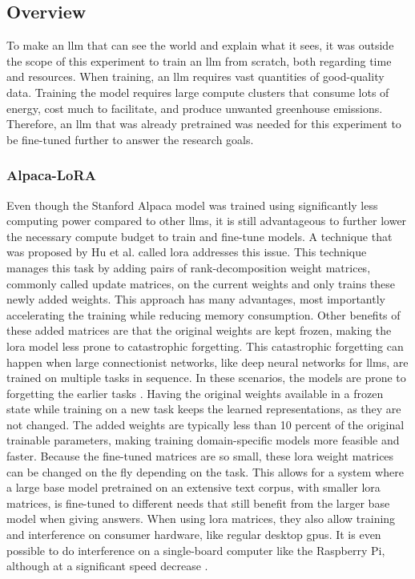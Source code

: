         \subsection{Overview}
        To make an \gls{llm} that can see the world and explain what it sees, it was outside the scope of this experiment to train an \gls{llm} from scratch, both regarding time and resources. When training, an \gls{llm} requires vast quantities of good-quality data. Training the model requires large compute clusters that consume lots of energy, cost much to facilitate, and produce unwanted greenhouse emissions. Therefore, an \gls{llm} that was already pretrained was needed for this experiment to be fine-tuned further to answer the research goals. 
        


        \subsubsection{Alpaca-LoRA}
        Even though the Stanford Alpaca model was trained using significantly less computing power compared to other \glspl{llm}, it is still advantageous to further lower the necessary compute budget to train and fine-tune models. A technique that was proposed by Hu et al. called \gls{lora} \cite{huLoRALowRankAdaptation2021} addresses this issue. This technique manages this task by adding pairs of rank-decomposition weight matrices, commonly called update matrices, on the current weights and only trains these newly added weights. This approach has many advantages, most importantly accelerating the training while reducing memory consumption. Other benefits of these added matrices are that the original weights are kept frozen, making the \gls{lora} model less prone to catastrophic forgetting. This catastrophic forgetting can happen when large connectionist networks, like deep neural networks for \glspl{llm}, are trained on multiple tasks in sequence. In these scenarios, the models are prone to forgetting the earlier tasks \cite{mccloskeyCatastrophicInterferenceConnectionist1989}. Having the original weights available in a frozen state while training on a new task keeps the learned representations, as they are not changed. The added weights are typically less than 10 percent of the original trainable parameters, making training domain-specific models more feasible and faster. 
        Because the fine-tuned matrices are so small, these \gls{lora} weight matrices can be changed on the fly depending on the task. 
        This allows for a system where a large base model pretrained on an extensive text corpus, with smaller \gls{lora} matrices, is fine-tuned to different needs that still benefit from the larger base model when giving answers.
        When using \gls{lora} matrices, they also allow training and interference on consumer hardware, like regular desktop \glspl{gpu}. It is even possible to do interference on a single-board computer like the Raspberry Pi, although at a significant speed decrease \cite{artemandreenko[@miolini]VeSucefullyRunned2023}. 


